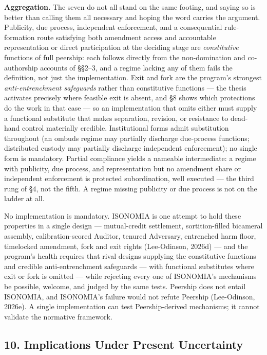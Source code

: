 \documentclass[
  11pt,
  letterpaper,
]{article}
\begin{document}
\textbf{Aggregation.} The seven do not all stand on the same footing,
and saying so is better than calling them all necessary and hoping the
word carries the argument. Publicity, due process, independent
enforcement, and a consequential rule-formation route satisfying both
amendment access and accountable representation or direct participation
at the deciding stage are \emph{constitutive} functions of full
peership: each follows directly from the non-domination and
co-authorship accounts of §§2--3, and a regime lacking any of them fails
the definition, not just the implementation. Exit and fork are the
program's strongest \emph{anti-entrenchment safeguards} rather than
constitutive functions --- the thesis activates precisely where feasible
exit is absent, and §8 shows which protections do the work in that case
--- so an implementation that omits either must supply a functional
substitute that makes separation, revision, or resistance to dead-hand
control materially credible. Institutional forms admit substitution
throughout (an ombuds regime may partially discharge due-process
functions; distributed custody may partially discharge independent
enforcement); no single form is mandatory. Partial compliance yields a
nameable intermediate: a regime with publicity, due process, and
representation but no amendment share or independent enforcement is
protected subordination, well executed --- the third rung of §4, not the
fifth. A regime missing publicity or due process is not on the ladder at
all.

No implementation is mandatory. ISONOMIA is one attempt to hold these
properties in a single design --- mutual-credit settlement,
sortition-filled bicameral assembly, calibration-scored Auditor, tenured
Adversary, entrenched harm floor, timelocked amendment, fork and exit
rights (Lee-Odinson, 2026d) --- and the program's health requires that
rival designs supplying the constitutive functions and credible
anti-entrenchment safeguards --- with functional substitutes where exit
or fork is omitted --- while rejecting every one of ISONOMIA's
mechanisms be possible, welcome, and judged by the same tests. Peership
does not entail ISONOMIA, and ISONOMIA's failure would not refute
Peership (Lee-Odinson, 2026e). A single implementation can test
Peership-derived mechanisms; it cannot validate the normative framework.

\hypertarget{implications-under-present-uncertainty}{%
\subsection{10. Implications Under Present
Uncertainty}\label{implications-under-present-uncertainty}}
\end{document}

